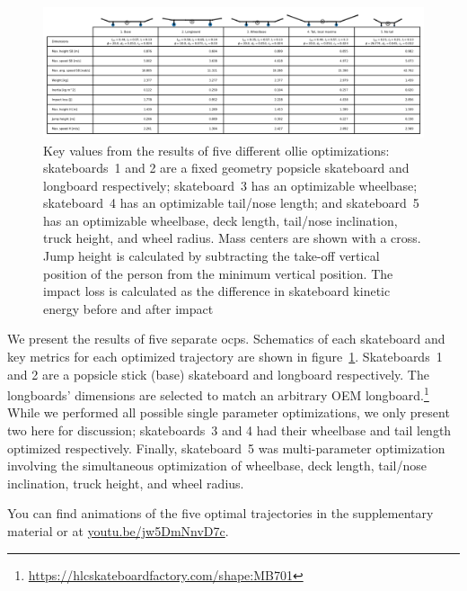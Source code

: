 \documentclass[default,iicol]{sn-jnl}
\begin{document}
\begin{figure}
    \centering
    \includegraphics[width=\textwidth]{paper/figure/Results/ResultsTable.png}
    \caption[Results benchmarks]{Key values from the results of five different ollie optimizations: skateboards~1 and 2 are a fixed geometry popsicle skateboard and longboard respectively; skateboard~3 has an optimizable wheelbase; skateboard~4 has an optimizable tail/nose length; and skateboard~5 has an optimizable wheelbase, deck length, tail/nose inclination, truck height, and wheel radius. Mass centers are shown with a cross. Jump height is calculated by subtracting the take-off vertical position of the person from the minimum vertical position. The impact loss is calculated as the difference in skateboard kinetic energy before and after impact}
    \label{fig:resultstable}
\end{figure}

We present the results of five separate \glspl{ocp}. Schematics of each skateboard and key metrics for each optimized trajectory are shown in figure~\ref{fig:resultstable}. Skateboards~1 and 2 are a popsicle stick (base) skateboard and longboard respectively. The longboards' dimensions are selected to match an arbitrary OEM longboard.\footnote{\url{https://hlcskateboardfactory.com/shape:MB701}} While we performed all possible single parameter optimizations, we only present two here for discussion; skateboards~3 and 4 had their wheelbase and tail length optimized respectively. Finally, skateboard~5 was multi-parameter optimization involving the simultaneous optimization of wheelbase, deck length, tail/nose inclination, truck height, and wheel radius.

You can find animations of the five optimal trajectories in the supplementary material or at \url{youtu.be/jw5DmNnvD7c}.

\end{document}

